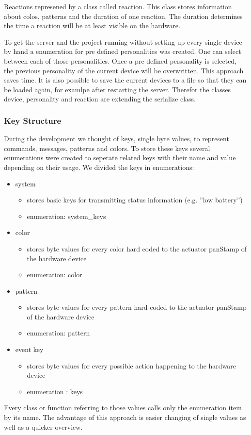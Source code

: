 Reactions represened by a class called reaction. This class stores information
about colos, patterns and the duration of one reaction. The duration determines
the time a reaction will be at least visible on the hardware.

To get the server and the project running without setting up every single device
by hand a enumeration for pre defined personalities was created. One can select
between each of those personalities. Once a pre defined personality is selected,
the previous personality of the current device will be overwritten. This
approach saves time. It is also possible to save the current devices to a file
so that they can be loaded again, for examlpe after restarting the server.
Therefor the classes device, personality and reaction are extending the
serialize class.

\subsubsection{Key Structure}
During the development we thought of keys, single byte values, to represent commands, messages, patterns and colors. To store these keys several enumerations were created to seperate related keys with their name and value depending on their usage.
We divided the keys in enumerations:
\begin{itemize}
    \item system
    \begin{itemize}
         \item stores basic keys for transmitting status information (e.g. ''low battery'')
				 \item enumeration: system\_keys
    \end{itemize}
    \item color
    \begin{itemize}
        \item stores byte values for every color hard coded to the actuator panStamp of the hardware device
				\item enumeration: color
    \end{itemize}
    \item pattern
    \begin{itemize}
        \item stores byte values for every pattern hard coded to the actuator panStamp of the hardware device
				\item enumeration: pattern
    \end{itemize}
    \item event key
    \begin{itemize}
        \item stores byte values for every possible action happening to the hardware device
				\item enumeration : keys
    \end{itemize}
\end{itemize} 

Every class or function referring to those values calls only the enumeration item by its name. The advantage of this approach is easier changing of single values as well as a quicker overview.
